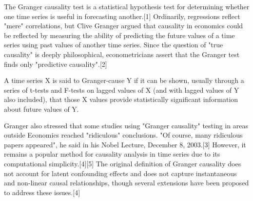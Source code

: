 The Granger causality test is a statistical hypothesis test for determining whether one time series is useful in forecasting another.[1] Ordinarily, regressions reflect "mere" correlations, but Clive Granger argued that causality in economics could be reflected by measuring the ability of predicting the future values of a time series using past values of another time series. Since the question of "true causality" is deeply philosophical, econometricians assert that the Granger test finds only "predictive causality".[2]
 
A time series X is said to Granger-cause Y if it can be shown, usually through a series of t-tests and F-tests on lagged values of X (and with lagged values of Y also included), that those X values provide statistically significant information about future values of Y.
 
Granger also stressed that some studies using "Granger causality" testing in areas outside Economics reached "ridiculous" conclusions. "Of course, many ridiculous papers appeared", he said in his Nobel Lecture, December 8, 2003.[3] However, it remains a popular method for causality analysis in time series due to its computational simplicity.[4][5] The original definition of Granger causality does not account for latent confounding effects and does not capture instantaneous and non-linear causal relationships, though several extensions have been proposed to address these issues.[4]
